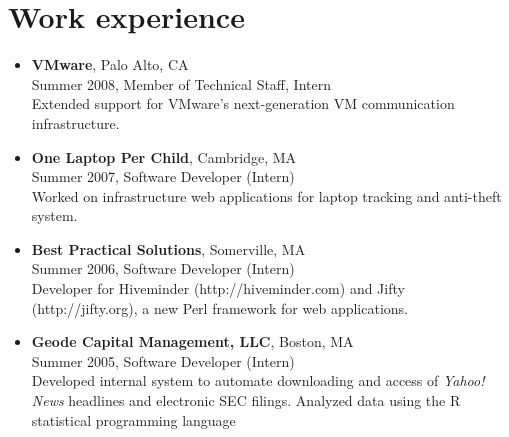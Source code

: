 \documentclass[letterpaper,10pt]{article}
\begin{document}
\section*{Work experience}
\vspace*{-0.2cm}
\begin{itemize}
  \item\textbf{VMware}, Palo Alto, CA \\
    Summer 2008, Member of Technical Staff, Intern \\
    Extended support for VMware's next-generation VM communication
    infrastructure.
  \item\textbf{One Laptop Per Child}, Cambridge, MA \\
    Summer 2007, Software Developer (Intern) \\
    Worked on infrastructure web applications for laptop tracking and
    anti-theft system.
  \item \textbf{Best Practical Solutions}, Somerville, MA \\
    Summer 2006, Software Developer (Intern) \\
    Developer for Hiveminder (http://hiveminder.com) and Jifty
    (http://jifty.org), a new Perl framework for web applications.
          
  \item \textbf{Geode Capital Management, LLC}, Boston, MA \\
  Summer 2005, Software Developer (Intern) \\
  Developed internal system to automate downloading and access of {\em
    Yahoo! \textregistered News} headlines and electronic SEC
  filings. Analyzed data using the R statistical programming language
\end{itemize}
\end{document}
